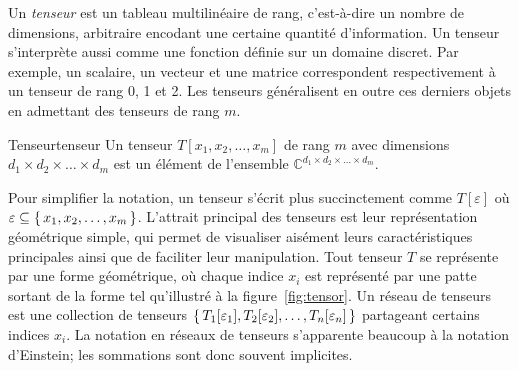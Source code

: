 Un \textit{tenseur} est un tableau multilinéaire de rang, c'est-à-dire un nombre de dimensions, arbitraire encodant une certaine quantité d'information. Un tenseur s'interprète aussi comme une fonction définie sur un domaine discret. Par exemple, un scalaire, un vecteur et une matrice correspondent respectivement à un tenseur de rang 0, 1 et 2. Les tenseurs généralisent en outre ces derniers objets en admettant des tenseurs de rang $m$. 

\begin{subdefinition}{Tenseur}{tenseur}
    Un tenseur $T[x_{1}, x_{2}, \dots, x_{m}]$ de rang $m$ avec dimensions $d_{1} \times d_{2} \times \dots \times d_{m}$ est un élément de l'ensemble $\mathbb{C}^{d_{1} \times d_{2} \times \dots \times d_{m}}$.
\end{subdefinition}

Pour simplifier la notation, un tenseur s'écrit plus succinctement comme $T[\varepsilon]$ où $\varepsilon \subseteq \set{ x_{1}, x_{2}, \dots, x_{m} }$. L'attrait principal des tenseurs est leur représentation géométrique simple, qui permet de visualiser aisément leurs caractéristiques principales ainsi que de faciliter leur manipulation. Tout tenseur $T$ se représente par une forme géométrique, où chaque indice $x_{i}$ est représenté par une patte sortant de la forme tel qu'illustré à la figure~\ref{fig:tensor}. Un réseau de tenseurs est une collection de tenseurs $\set{ T_{1}[\varepsilon_{1}], T_{2}[\varepsilon_{2}], \dots, T_{n}[\varepsilon_{n}] }$ partageant certains indices $x_{i}$. La notation en réseaux de tenseurs s'apparente beaucoup à la notation d'Einstein; les sommations sont donc souvent implicites. 

